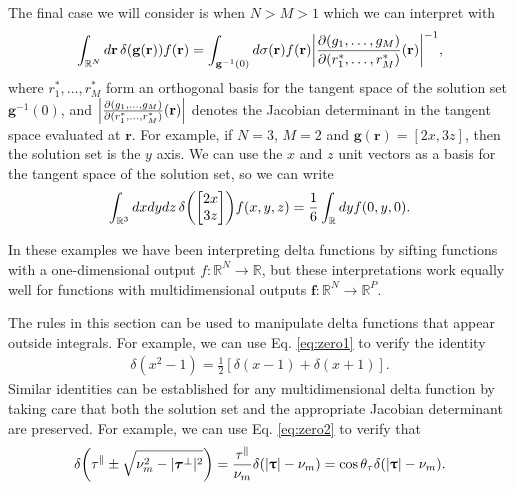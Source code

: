\documentclass[]{osa-article}
\let\originalleft\left
\let\originalright\right
\renewcommand{\left}{\mathopen{}\mathclose\bgroup\originalleft}
\renewcommand{\right}{\aftergroup\egroup\originalright}
\providecommand{\mb}[1]{\mathbf{#1}}
\newcommand{\mypar}{\parallel}
\providecommand{\mbb}[1]{\mathbb{#1}}
\providecommand{\bs}[1]{\boldsymbol{#1}}
\providecommand{\bt}{\bs{\uptau}}
\providecommand{\btperp}{\bs{\tau}^{\bot}}
\providecommand{\btpar}{\tau^{\mypar}}
\begin{document}
The final case we will consider is when $N > M > 1$ which we can interpret with
\begin{align}
  \int_{\mbb{R}^N}d\mb{r}\,\delta(\mb{g}(\mb{r}))f(\mb{r}) = \int_{\mb{g}^{-1}(0)}d\sigma(\mb{r})f(\mb{r})\left|\frac{\partial(g_1,\dots,g_M)}{\partial(r^*_1,\dots,r^*_M)}(\mb{r})\right|^{-1},\label{eq:transversedelta}
\end{align}
where $r_1^*,\dots,r_M^*$ form an orthogonal basis for the tangent space of the solution set $\mb{g}^{-1}(0)$, and $\left|\frac{\partial(g_1,\dots,g_M)}{\partial(r^*_1,\dots,r^*_M)}(\mb{r})\right|$ denotes the Jacobian determinant in the tangent space evaluated at $\mb{r}$. For example, if $N = 3$, $M = 2$ and $\mb{g}(\mb{r}) = [2x, 3z]$, then the solution set is the $y$ axis. We can use the $x$ and $z$ unit vectors as a basis for the tangent space of the solution set, so we can write
\begin{align}
  \int_{\mbb{R}^3}dxdydz\,\delta\left(\begin{bmatrix}2x\\3z\end{bmatrix}\right)f(x,y,z) = \frac{1}{6}\int_{\mbb{R}}dy f(0,y,0).
\end{align}

In these examples we have been interpreting delta functions by sifting functions with a one-dimensional output $f:\mbb{R}^N\rightarrow \mbb{R}$, but these interpretations work equally well for functions with multidimensional outputs $\mb{f}:\mbb{R}^N\rightarrow \mbb{R}^P$.

The rules in this section can be used to manipulate delta functions that appear outside integrals. For example, we can use Eq. \eqref{eq:zero1} to verify the identity
\begin{align}
  \delta(x^2 - 1) = \frac{1}{2}[\delta(x - 1) + \delta(x + 1)]. 
\end{align}
Similar identities can be established for any multidimensional delta function by taking care that both the solution set and the appropriate Jacobian determinant are preserved. For example, we can use Eq. \eqref{eq:zero2} to verify that
\begin{align}
   \delta\left(\btpar \pm \sqrt{\nu_m^2 - |\btperp|^2}\right) = \frac{\btpar}{\nu_m}\delta\left(|\bt| - \nu_m\right) = \cos\theta_\tau\delta\left(|\bt| - \nu_m\right).\label{eq:sphereidentity}
\end{align}
\end{document}
